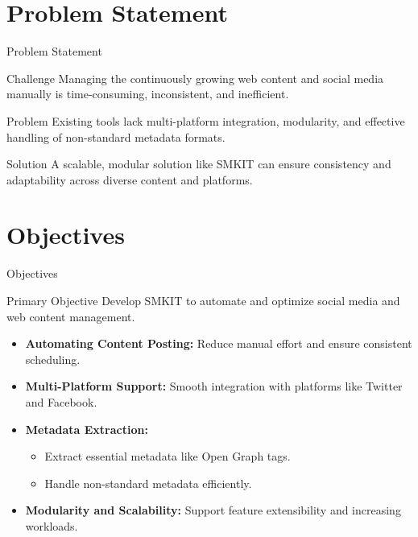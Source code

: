 \documentclass{beamer}
\begin{document}
\section{Problem Statement}
    \begin{frame}{Problem Statement}
        \begin{block}{Challenge}
            Managing the continuously growing web content and social media manually is time-consuming, inconsistent, and inefficient.
        \end{block}

        \vspace{0.5cm}

        \begin{alertblock}{Problem}
            Existing tools lack multi-platform integration, modularity, and effective handling of non-standard metadata formats.
        \end{alertblock}

        \vspace{0.5cm}

        \begin{exampleblock}{Solution}
            A scalable, modular solution like SMKIT can ensure consistency and adaptability across diverse content and platforms.
        \end{exampleblock}
    \end{frame}


\section{Objectives}
    \begin{frame}{Objectives}
        \begin{block}{Primary Objective}
            Develop SMKIT to automate and optimize social media and web content management.
        \end{block}

        \begin{itemize}
            \item \textbf{Automating Content Posting:}
                Reduce manual effort and ensure consistent scheduling.
            \vspace{0.3cm}
            \item \textbf{Multi-Platform Support:}
                Smooth integration with platforms like Twitter and Facebook.
            \vspace{0.3cm}
            \item \textbf{Metadata Extraction:}
                \begin{itemize}
                    \item Extract essential metadata like Open Graph tags.
                    \item Handle non-standard metadata efficiently.
                \end{itemize}
            \vspace{0.3cm}
            \item \textbf{Modularity and Scalability:}
                Support feature extensibility and increasing workloads.
        \end{itemize}
    \end{frame}
\end{document}
